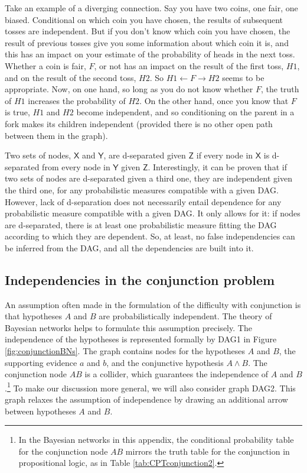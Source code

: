 \documentclass[
  10pt,
  dvipsnames,enabledeprecatedfontcommands]{scrartcl}
\begin{document}
{Take an example of a diverging connection.  Say you have two coins, one fair, one biased. Conditional on which coin you have chosen, the results of subsequent tosses are independent. But if you don't know which coin you have chosen, the result of previous tosses give you some information about which coin it is, and this has an impact on your estimate of the probability of heads in the next toss. Whether a coin is fair, $F$, or not has an impact on the result of the first toss, $H1$, and on the result of the second toss, $H2$.  So $H1 \leftarrow F \rightarrow H2$ seems to be appropriate. Now, on one hand, so long as you do not know whether $F$, the truth of $H1$ increases the probability of $H2$.  On the other hand, once you know that $F$ is true, $H1$ and $H2$ become independent, and so conditioning on the parent in a fork makes its children independent (provided there is no other open path between them in the graph).}

Two sets of nodes, \(\mathsf{X}\) and \(\mathsf{Y}\), are d-separated
given \(\mathsf{Z}\) if every node in \(\mathsf{X}\) is d-separated from
every node in \(\mathsf{Y}\) given \(\mathsf{Z}\). Interestingly, it can
be proven that if two sets of nodes are d-separated given a third one,
they are independent given the third one, for any probabilistic measures
compatible with a given DAG. However, lack of d-separation does not
necessarily entail dependence for any probabilistic measure compatible
with a given DAG. It only allows for it: if nodes are d-separated, there
is at least one probabilistic measure fitting the DAG according to which
they are dependent. So, at least, no false independencies can be
inferred from the DAG, and all the dependencies are built into it.

\hypertarget{independencies-in-the-conjunction-problem}{%
\subsection*{Independencies in the conjunction
problem}\label{independencies-in-the-conjunction-problem}}

An assumption often made in the formulation of the difficulty with
conjunction is that hypotheses \(A\) and \(B\) are probabilistically
independent. The theory of Bayesian networks helps to formulate this
assumption precisely. The independence of the hypotheses is represented
formally by \textsf{DAG1} in Figure \ref{fig:conjunctionBNs}. The graph
contains nodes for the hypotheses \(A\) and \(B\), the supporting
evidence \(a\) and \(b\), and the conjunctive hypothesis \(A\wedge B\).
The conjunction node \(AB\) is a collider, which guarantees the
independence of \(A\) and \(B\).\footnote{In the Bayesian networks in
  this appendix, the conditional probability table for the conjunction
  node \(AB\) mirrors the truth table for the conjunction in
  propositional logic, as in Table \ref{tab:CPTconjunction2}.} To make
our discussion more general, we will also consider graph \textsf{DAG2}.
This graph relaxes the assumption of independence by drawing an
additional arrow between hypotheses \(A\) and \(B\).
\end{document}
